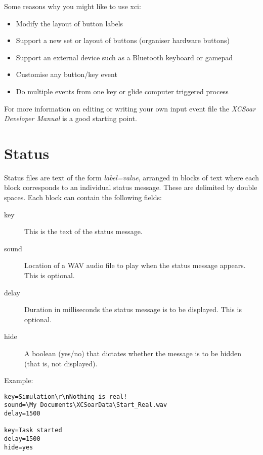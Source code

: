 Some reasons why you might like to use xci:
\begin{itemize}
\item Modify the layout of button labels
\item Support a new set or layout of buttons (organiser hardware buttons)
\item Support an external device such as a Bluetooth keyboard or gamepad
\item Customise any button/key event
\item Do multiple events from one key or glide computer triggered process
\end{itemize}
For more information on editing or writing your own input event
file the {\em XCSoar Developer Manual} is a good starting point.


\section{Status}\label{sec:status-file}

Status files are text of the form {\em label=value}, arranged in
blocks of text where each block corresponds to an individual status
message.  These are delimited by double spaces.  Each block can
contain the following fields:
\begin{description}
\item[key]  This is the text of the status message.
\item[sound] Location of a WAV audio file to play when the status
  message appears.  This is optional.
\item[delay] Duration in milliseconds the status message is
  to be displayed.  This is optional.
\item[hide] A boolean (yes/no) that dictates whether the message
 is to be hidden (that is, not displayed). 
\end{description} 

Example:
\begin{verbatim}
key=Simulation\r\nNothing is real!
sound=\My Documents\XCSoarData\Start_Real.wav
delay=1500

key=Task started
delay=1500
hide=yes
\end{verbatim}
